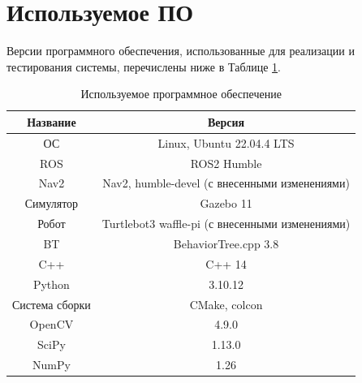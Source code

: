 \section{Используемое ПО}

Версии программного обеспечения, использованные для реализации и тестирования системы, перечислены ниже в Таблице \ref*{tab:os_vers}.

\begin{table}[h]
    \centering
    \begin{tabular}{|c|c|}
        \hline
        \textbf{Название} & \textbf{Версия} \\
        \hline
        ОС & Linux, Ubuntu 22.04.4 LTS \\
        \hline
        ROS & ROS2 Humble \\
        \hline
        Nav2 & Nav2, humble-devel (с внесенными изменениями) \\
        \hline
        Симулятор & Gazebo 11 \\
        \hline
        Робот & Turtlebot3 waffle-pi (с внесенными изменениями) \\
        \hline
        BT & BehaviorTree.cpp 3.8 \\
        \hline
        C++ & C++ 14 \\
        \hline
        Python & 3.10.12 \\
        \hline
        Система сборки & CMake, colcon \\
        \hline
        OpenCV & 4.9.0 \\
        \hline
        SciPy & 1.13.0 \\
        \hline
        NumPy & 1.26 \\
        \hline
    \end{tabular}
    \caption{Используемое программное обеспечение}
    \label{tab:os_vers}
\end{table}

\endinput